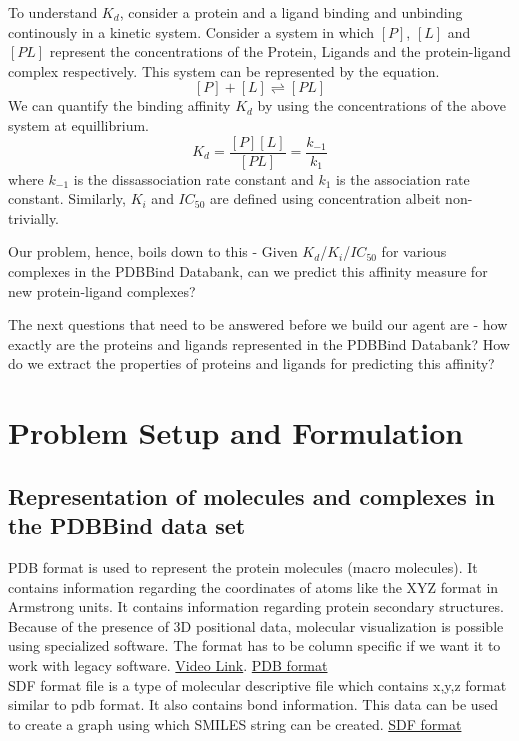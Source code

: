 \documentclass[11pt]{article}
\begin{document}
To understand $K_d$, consider a protein and a ligand binding and unbinding continously in a kinetic system.
Consider a system in which $[P]$, $[L]$ and $[PL]$ represent the concentrations of the Protein, Ligands 
and the protein-ligand complex respectively.
This system can be represented by the equation.
$$[P] + [L] \rightleftharpoons [PL]$$
We can quantify the binding affinity $K_d$ by using the concentrations of the above system at equillibrium.
$$K_d = \frac{[P][L]}{[PL]} = \frac{k_{-1}}{k_1}$$
where $k_{-1}$ is the dissassociation rate constant and $k_1$ is the association rate constant.
Similarly, $K_i$ and $IC_{50}$ are defined using concentration albeit non-trivially. 
\cite{binding_affinity_description}

Our problem, hence, boils down to this - Given $K_d$/$K_i$/$IC_{50}$ for various complexes in the PDBBind Databank,
can we predict this affinity measure for new protein-ligand complexes?

The next questions that need to be answered before we build our agent are - how exactly are the proteins and ligands represented in the PDBBind Databank?
How do we extract the properties of proteins and ligands for predicting this affinity?

\section{Problem Setup and Formulation}

\subsection{Representation of molecules and complexes in the PDBBind data set}

PDB format is used to represent the protein molecules (macro molecules).
It contains information regarding the coordinates of atoms like the XYZ format in Armstrong units.
It contains information regarding protein secondary structures.
Because of the presence of 3D positional data, molecular visualization is possible using specialized software. 
The format has to be column specific if we want it to work with legacy software.
\href{https://www.youtube.com/watch?v=_1q7sfjl2Kw}{Video Link}.
\href{https://en.wikipedia.org/wiki/Protein_Data_Bank_(file_format)}{PDB format}\\

SDF format file is a type of molecular descriptive file which contains x,y,z format similar to pdb format.
It also contains bond information.
This data can be used to create a graph using which SMILES string can be created.
\href{https://en.wikipedia.org/wiki/Chemical_table_file}{SDF format}
\end{document}
